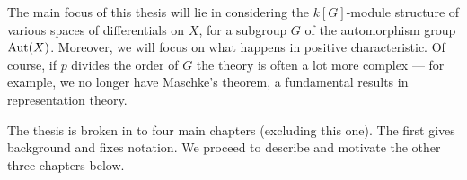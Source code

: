 The main focus of this thesis will lie in considering the $k[G]$-module structure of various spaces of differentials on $X$, for a subgroup $G$ of the automorphism group $\operatorname{Aut}(X)$.
Moreover, we will focus on what happens in positive characteristic.
Of course, if $p$ divides the order of $G$ the theory is often a lot more complex --- for example, we no longer have Maschke's theorem, a fundamental results in representation theory.

The thesis is broken in to four main chapters (excluding this one).
The first gives background and fixes notation.
We proceed to describe and motivate the other three chapters below.

\begin{comment}




Riemann planted the seeds for this to happen when he, along with Roch, proved the Riemann-Roch theorem, showing the pre-eminent role that meromorphic functions and differentials play in the study of Riemann surfaces.\todo{reference Riemann's thesis}
In his study of this area, Riemann viewed differentials from an geometric-analytic perspective, as maps on tangent space bundle of the surfaces he was considering.

It was known at the time that the existence of meromorphic functions implied gave the equivalence of compact Riemann surfaces and smooth complex curves, but what the Riemann-Roch theorem gave was a way to define the genus of a curve, in terms of the dimension of the space of holomorphic differentials, $\hzero$.\todo{reference original paper of Riemann-Roch}
It is for this reason that differentials, and in particular holomorphic differentials, have played such a pivotal role in the development of the theory of algebraic curves.

On the other hand, the automorphism groups of curves are of interest themselves. \todo{expand}

Of course, any action on a Riemann surface $X$ also gives rise to an action on the functions and differentials on $X$.
It is therefore a natural thing that in \todo{find year} Hecke asked what the $\CC [G]$-module structure of $\hzero$ was.
It is with this problem in mind that the bulk of this thesis was written.

Now the problem as stated above, for complex curves,  was solved by Chevalley and Weil, who completely described the $\CC[G]$-module structure of the space of holomorphic differentials of a smooth curve in \todo{cite}.
However, as the century progressed, it became more natural to ask the same questions over an arbitrary field $k$.\todo{change to general curve}

However, there is much more difficulty when the characterisitic of $p$ does divide the order of $G$.
In fact, the $k[G]$-module structure of $\hzero$ is still unknown in this case.
However, there are 
\end{comment}


